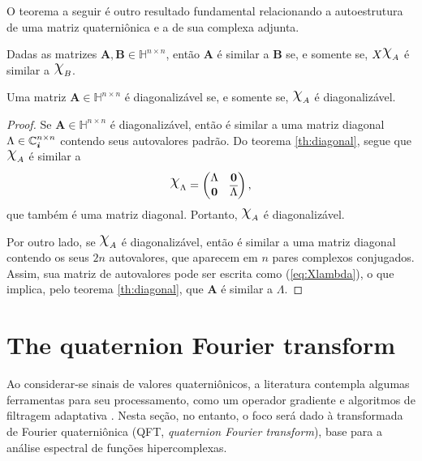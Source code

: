 O teorema a seguir \'e outro resultado fundamental relacionando a autoestrutura de uma matriz quaterni\^onica e a de sua complexa adjunta.

\begin{theorem}
\label{th:diagonal}
Dadas as matrizes $ \mathbf{A}, \mathbf{B} \in \mathbb{H}^{n \times n} $, ent\~ao $ \mathbf{A} $ \'e similar a $ \mathbf{B} $ se, e somente se, $ X\rchi_A $ \'e similar a $ \rchi_B $.
\end{theorem}

\begin{corollary}
\label{cor:diagonalizable}
Uma matriz $  \mathbf{A} \in \mathbb{H}^{n \times n} $ \'e diagonaliz\'avel se, e somente se, $ \rchi_A $ \'e diagonaliz\'avel.
\end{corollary}
\begin{proof}
Se $ \mathbf{A} \in \mathbb{H}^{n \times n} $ \'e diagonaliz\'avel, ent\~ao \'e similar a uma matriz diagonal $ \Lambda \in \mathbb{C}^{n \times n}_{\boldsymbol{i}} $ contendo seus autovalores padr\~ao. Do teorema \ref{th:diagonal}, segue que $ \rchi_A $ \'e similar a
\begin{equation}
\label{eq:Xlambda}
\rchi_{\Lambda} =
\begin{pmatrix}
\Lambda & \mathbf{0}\\ 
\mathbf{0} & \overline{\Lambda}
\end{pmatrix},
\end{equation}
que tamb\'em \'e uma matriz diagonal. Portanto, $ \rchi_A $ \'e diagonaliz\'avel.

Por outro lado, se $ \rchi_A $ \'e diagonaliz\'avel, ent\~ao \'e similar a uma matriz diagonal contendo os seus $ 2n $ autovalores, que aparecem em $ n $ pares complexos conjugados. Assim, sua matriz de autovalores pode ser escrita como (\ref{eq:Xlambda}), o que implica, pelo teorema \ref{th:diagonal}, que $ \mathbf{A} $ \'e similar a $ \Lambda $.
\end{proof}

\section{The quaternion Fourier transform}
\label{sec:QFT}

Ao considerar-se sinais de valores quaterni\^onicos, a literatura contempla algumas ferramentas para seu processamento, como um operador gradiente \cite{jiang2014general} e algoritmos de filtragem adaptativa \cite{jiang2013frequency}. Nesta se\c c\~ao, no entanto, o foco ser\'a dado \`a transformada de Fourier quaterni\^onica (QFT, \emph{quaternion Fourier transform}), base para a an\'alise espectral de fun\c c\~oes hipercomplexas.

